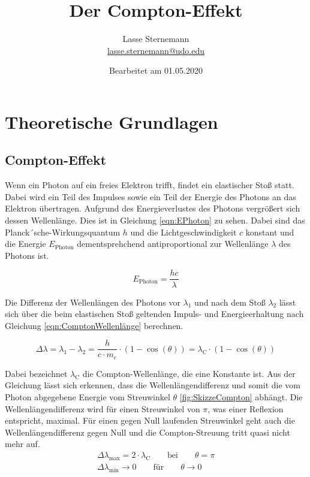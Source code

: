 \documentclass[titlepage = firstcover]{scrartcl}
\title{Der Compton-Effekt}
\author{
  Lasse Sternemann\\
  \href{mailto:lasse.sternemann@udo.edu}{lasse.sternemann@udo.edu}
}
\date{Bearbeitet am 01.05.2020}
\begin{document}
    \maketitle
    \newpage
    \tableofcontents
    \newpage

    \section{Theoretische Grundlagen}
        \subsection{Compton-Effekt}
        Wenn ein Photon auf ein freies Elektron trifft, findet ein elastischer Stoß statt. Dabei wird ein Teil des Impulses sowie ein Teil der 
        Energie des Photons an das Elektron übertragen. Aufgrund des Energieverlustes des Photons vergrößert sich dessen Wellenlänge. Dies ist in 
        Gleichung \ref{eqn:EPhoton} zu sehen. Dabei sind das Planck´sche-Wirkungsquantum $h$ und die Lichtgeschwindigkeit $c$ konstant und die Energie $E_{\text{Photon}}$ dementsprehchend
        antiproportional zur Wellenlänge $\lambda$ des Photons ist. 

        \begin{equation}
            E_{\text{Photon}} = \frac{hc}{\lambda}
            \label{eqn:EPhoton}
        \end{equation}
        
        \noindent
        Die Differenz der Wellenlängen des Photons vor $\lambda _1$ und nach dem Stoß $\lambda _2$ lässt sich über die beim elastischen Stoß geltenden
        Impuls- und Energieerhaltung nach Gleichung \ref{eqn:ComptonWellenlänge} berechnen.

        \begin{equation}
            \Delta \lambda = \lambda_1 - \lambda_2 = \frac{h}{c \cdot m_e} \cdot \left(1-\cos(\theta)\right) = \lambda_{\text{C}} \cdot \left(1-\cos(\theta)\right)
            \label{eqn:ComptonWellenlänge}
        \end{equation}
        
        \noindent
        Dabei bezeichnet $\lambda_{\text{C}}$ die Compton-Wellenlänge, die eine Konstante ist. Aus der Gleichung lässt sich erkennen, dass die 
        Wellenlängendifferenz und somit die vom Photon abgegebene Energie vom Streuwinkel $\theta$ \ref{fig:SkizzeCompton} abhängt. Die Wellenlängendifferenz 
        wird für einen Streuwinkel von $\pi$, was einer Reflexion entspricht, maximal. Für einen gegen Null laufenden Streuwinkel geht auch die 
        Wellenlängendifferenz gegen Null und die Compton-Streuung tritt quasi nicht mehr auf.
        \begin{align*}
            \Delta \lambda_{\text{max}} = 2 \cdot \lambda_{\text{C}} \qquad \text{bei} \qquad \theta = \pi \\
            \Delta \lambda_{\text{min}} \longrightarrow 0 \qquad \text{für} \qquad \theta \longrightarrow 0
        \end{align*}
        \noindent
\end{document}
